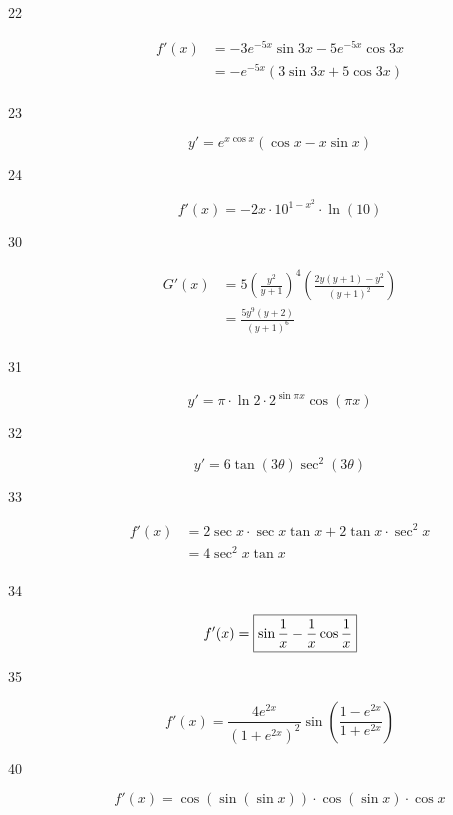 \documentclass[letterpaper, landscape]{exam}
\begin{document}
\begin{description}
    \item[22] 
      \begin{align*}
        f'(x) & = -3e^{-5x} \sin 3x - 5e^{-5x} \cos 3x \\
              & = \boxed{ -e^{-5x} (3 \sin 3x + 5 \cos 3x) } \\
      \end{align*}

    \item[23] 
      \[
        y' = \boxed{ e^{x \cos x} ( \cos x - x \sin x ) }
      \]

    \item[24] 
      \[
        f'(x) = \boxed{ -2x \cdot 10^{1 - x^2} \cdot \ln(10) } 
      \]

    \item[30] 
      \begin{align*}
        G'(x) & = 5 \left( \frac{y^2}{y + 1} \right)^4 \left(  \frac{2y (y + 1) - y^2 }{(y + 1)^2}  \right) \\
              & = \boxed{ \frac{5 y^9 (y + 2)}{(y + 1)^6} } \\
      \end{align*}

    \item[31] 
      \[
        y' = \boxed{ \pi \cdot \ln 2 \cdot 2^{\sin \pi x} \cos(\pi x) }
      \]

    \item[32] 
      \[
        y' = \boxed{ 6 \tan(3 \theta) \sec^2 (3 \theta) }
      \]

    \item[33] 
      \begin{align*}
        f'(x) & = 2 \sec x \cdot \sec x \tan x + 2 \tan x \cdot \sec^2 x \\
              & = \boxed{ 4 \sec^2 x \tan x } \\
      \end{align*}

    \item[34] 
      \[
        f'(x) = \boxed{ \sin \frac{1}{x} - \frac{1}{x} \cos \frac{1}{x} } \\
      \]

    \item[35] 
      \[
        f'(x) = \boxed{ \frac{4 e^{2x}}{\left( 1 + e^{2x} \right)^2} 
          \sin \left( \frac{1 - e^{2x}}{1 + e^{2x}} \right) }
      \]

    \item[40] 
      \[
        f'(x) = \boxed{ \cos(\sin(\sin x)) \cdot \cos(\sin x) \cdot \cos x }
      \]


\end{description}
\end{document}
